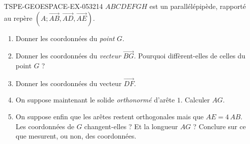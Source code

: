 \begin{exercice}{TSPE-GEOESPACE-EX-053}{2}{14}
$ABCDEFGH$ est un parallélépipède, rapporté au repère
$(A;\vec{AB},\vec{AD},\vec{AE})$.
\begin{enumerate}
  \item Donner les coordonnées du \emph{point} $G$.
  \item Donner les coordonnées du \emph{vecteur} $\vec{BG}$. Pourquoi
        diffèrent-elles de celles du point $G$ ?
  \item Donner les coordonnées du vecteur $\vec{DF}$.
  \item On suppose maintenant le solide \emph{orthonormé} d'arête $1$.
        Calculer $AG$.
  \item On suppose enfin que les arêtes restent orthogonales mais que
        $AE=4\,AB$. Les coordonnées de $G$ changent-elles ? Et la longueur
        $AG$ ? Conclure sur ce que mesurent, ou non, des coordonnées.
\end{enumerate}
\end{exercice}
